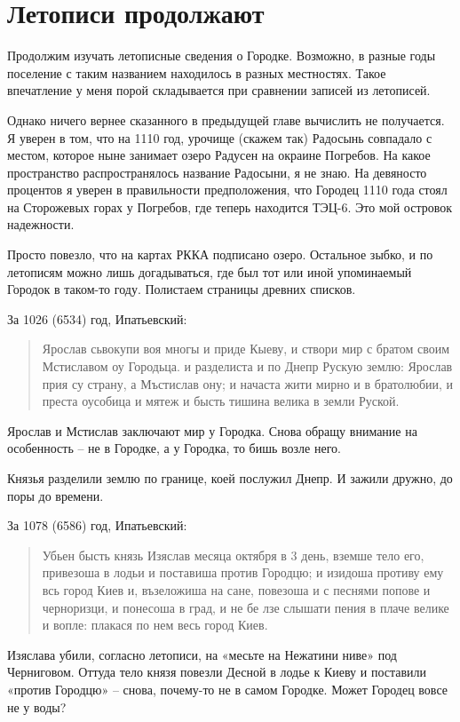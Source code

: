 \chapter{Летописи продолжают}

Продолжим изучать летописные сведения о Городке. Возможно, в разные годы поселение с таким названием находилось в разных местностях. Такое впечатление у меня порой складывается при сравнении записей из летописей. 

Однако ничего вернее сказанного в предыдущей главе вычислить не получается. Я уверен в том, что на 1110 год, урочище (скажем так) Радосынь совпадало с местом, которое ныне занимает озеро Радусен на окраине Погребов. На какое пространство распространялось название Радосыни, я не знаю. На девяносто процентов я уверен в правильности предположения, что Городец 1110 года стоял на Сторожевых горах у Погребов, где теперь находится ТЭЦ-6. Это мой островок надежности.  

Просто повезло, что на картах РККА подписано озеро. Остальное зыбко, и по летописям можно лишь догадываться, где был тот или иной упоминаемый Городок в таком-то году. Полистаем страницы древних списков.

За 1026 (6534) год, Ипатьевский:

\begin{quotation}
Ярослав сьвокупи воя многы и приде Кыеву, и створи мир с братом своим Мстиславом оу Городьца. и разделиста и по Днепр Рускую землю: Ярослав прия су страну, а Мъстислав ону; и начаста жити мирно и в братолюбии, и преста оусобица и мятеж и бысть тишина велика в земли Руской.
\end{quotation}

Ярослав и Мстислав заключают мир у Городка. Снова обращу внимание на особенность – не в Городке, а у Городка, то бишь возле него.

Князья разделили землю по границе, коей послужил Днепр. И зажили дружно, до поры до времени.

За 1078 (6586) год, Ипатьевский:

\begin{quotation}
Убьен бысть князь Изяслав месяца октября в 3 день, вземше тело его, привезоша в лодьи и поставиша против Городцю; и изидоша противу ему всь город Киев и, възеложиша на сане, повезоша и с песнями попове и черноризци, и понесоша в град, и не бе лзе слышати пения в плаче велике и вопле: плакася по нем весь город Киев.
\end{quotation}

Изяслава убили, согласно летописи, на «месьте на Нежатини ниве» под Черниговом. Оттуда тело князя повезли Десной в лодье к Киеву и поставили «против Городцю» – снова, почему-то не в самом Городке. Может Городец вовсе не у воды? 

